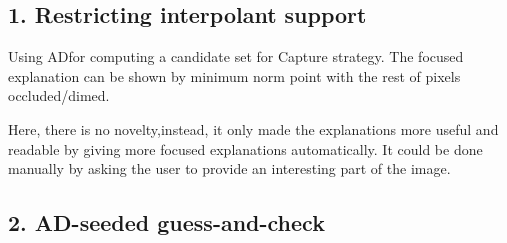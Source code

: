 \documentclass[11pt,a4paper]{article}
\newcommand{\rex}{\textsc{ReX}}
\newcommand{\convad}{\textsc{ConvAD}}
\newcommand{\verix}{\textsc{VeriX}}
\newcommand{\ad}{\textsc{AD}}
\begin{document}


\subsection*{1. Restricting interpolant support}

Using \ad for computing a candidate set for Capture strategy. 
The focused explanation can be shown by minimum norm point with the rest of pixels occluded/dimed. 

Here, there is no novelty,instead, it only made the explanations more useful and readable by giving more focused explanations automatically. 
It could be done manually by asking the user to provide an interesting part of the image.



\subsection*{2. \ad{}-seeded guess-and-check}
\end{document}
